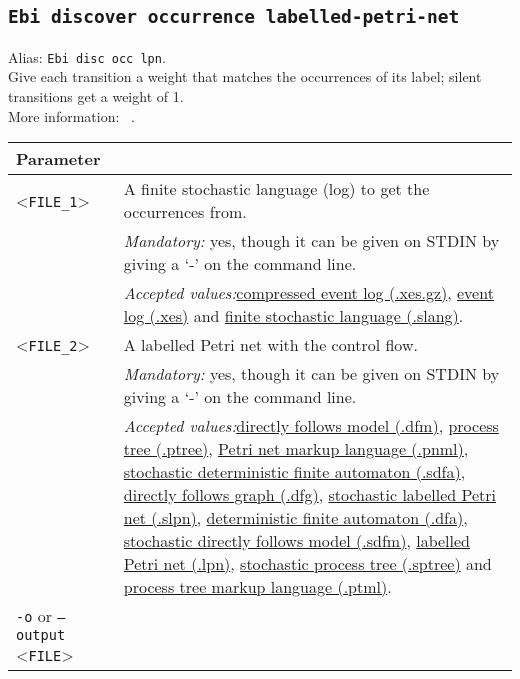 {\subsection{\texttt{Ebi discover occurrence labelled-petri-net}}
\label{command:Ebi discover occurrence labelled-petri-net}
Alias: \texttt{Ebi disc occ lpn}.\\
Give each transition a weight that matches the occurrences of its label; silent transitions get a weight of 1.\\
More information: ~\cite{DBLP:conf/icpm/BurkeLW20}.\\
\begin{tabularx}{\linewidth}{lX}
\toprule
Parameter \\\midrule
<\texttt{FILE\_1}>&A finite stochastic language (log) to get the occurrences from.\\
&\textit{Mandatory:} \quad yes, though it can be given on STDIN by giving a `-' on the command line.\\
&\textit{Accepted values:}\quad \hyperref[filehandler:compressed event log]{compressed event log (.xes.gz)}, \hyperref[filehandler:event log]{event log (.xes)} and \hyperref[filehandler:finite stochastic language]{finite stochastic language (.slang)}.\\
<\texttt{FILE\_2}>&A labelled Petri net with the control flow.\\
&\textit{Mandatory:} \quad yes, though it can be given on STDIN by giving a `-' on the command line.\\
&\textit{Accepted values:}\quad \hyperref[filehandler:directly follows model]{directly follows model (.dfm)}, \hyperref[filehandler:process tree]{process tree (.ptree)}, \hyperref[filehandler:Petri net markup language]{Petri net markup language (.pnml)}, \hyperref[filehandler:stochastic deterministic finite automaton]{stochastic deterministic finite automaton (.sdfa)}, \hyperref[filehandler:directly follows graph]{directly follows graph (.dfg)}, \hyperref[filehandler:stochastic labelled Petri net]{stochastic labelled Petri net (.slpn)}, \hyperref[filehandler:deterministic finite automaton]{deterministic finite automaton (.dfa)}, \hyperref[filehandler:stochastic directly follows model]{stochastic directly follows model (.sdfm)}, \hyperref[filehandler:labelled Petri net]{labelled Petri net (.lpn)}, \hyperref[filehandler:stochastic process tree]{stochastic process tree (.sptree)} and \hyperref[filehandler:process tree markup language]{process tree markup language (.ptml)}.\\
\texttt{-o} or \texttt{--output} <\texttt{FILE}> &

\end{tabularx}}
